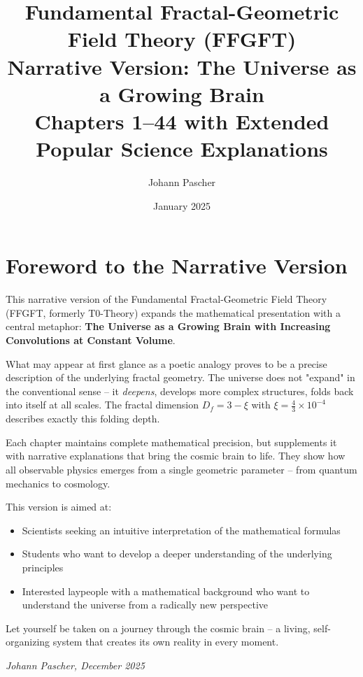 \documentclass[12pt]{book}
\title{%
	\textbf{Fundamental Fractal-Geometric Field Theory (FFGFT)} \\
	\Large Narrative Version: The Universe as a Growing Brain \\
	\normalsize Chapters 1--44 with Extended Popular Science Explanations
}
\author{Johann Pascher}
\date{January 2025}
\begin{document}
\maketitle

\tableofcontents



\chapter*{Foreword to the Narrative Version}

This narrative version of the Fundamental Fractal-Geometric Field Theory (FFGFT, formerly T0-Theory) expands the mathematical presentation with a central metaphor: \textbf{The Universe as a Growing Brain with Increasing Convolutions at Constant Volume}.

What may appear at first glance as a poetic analogy proves to be a precise description of the underlying fractal geometry. The universe does not "expand" in the conventional sense – it \textit{deepens}, develops more complex structures, folds back into itself at all scales. The fractal dimension $D_f = 3 - \xi$ with $\xi = \frac{4}{3} \times 10^{-4}$ describes exactly this folding depth.

Each chapter maintains complete mathematical precision, but supplements it with narrative explanations that bring the cosmic brain to life. They show how all observable physics emerges from a single geometric parameter – from quantum mechanics to cosmology.

This version is aimed at:
\begin{itemize}
	\item Scientists seeking an intuitive interpretation of the mathematical formulas
	\item Students who want to develop a deeper understanding of the underlying principles
	\item Interested laypeople with a mathematical background who want to understand the universe from a radically new perspective
\end{itemize}

Let yourself be taken on a journey through the cosmic brain – a living, self-organizing system that creates its own reality in every moment.

\vfill
\textit{Johann Pascher, December 2025}

\newpage
\end{document}
